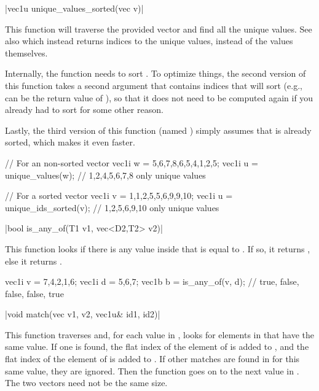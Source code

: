 \cppinline|vec1u unique_values_sorted(vec v)| 

This function will traverse the provided vector  and find all the unique values. See also  which instead returns indices to the unique values, instead of the values themselves.

Internally, the function needs to sort . To optimize things, the second version of this function takes a second argument  that contains indices that will sort  (e.g.,  can be the return value of ), so that it does not need to be computed again if you already had to sort  for some other reason.

Lastly, the third version of this function (named ) simply assumes that  is already sorted, which makes it even faster.

\begin{example}
\begin{cppcode}
// For an non-sorted vector
vec1i w = {5,6,7,8,6,5,4,1,2,5};
vec1i u = unique_values(w);  // {1,2,4,5,6,7,8} only unique values

// For a sorted vector
vec1i v = {1,1,2,5,5,6,9,9,10};
vec1i u = unique_ids_sorted(v); // {1,2,5,6,9,10} only unique values
\end{cppcode}
\end{example}

\funcitem \vectorfunc \cppinline|bool is_any_of(T1 v1, vec<D2,T2> v2)| 

This function looks if there is any value inside  that is equal to . If so, it returns \cpptrue, else it returns \cppfalse.

\begin{example}
\begin{cppcode}
vec1i v = {7,4,2,1,6};
vec1i d = {5,6,7};
vec1b b = is_any_of(v, d); // {true, false, false, false, true}
\end{cppcode}
\end{example}

\funcitem \cppinline|void match(vec v1, v2, vec1u& id1, id2)| 

This function traverses  and, for each value in , looks for elements in  that have the same value. If one is found, the flat index of the element of  is added to , and the flat index of the element of  is added to . If other matches are found in  for this same value, they are ignored. Then the function goes on to the next value in . The two vectors need not be the same size.

